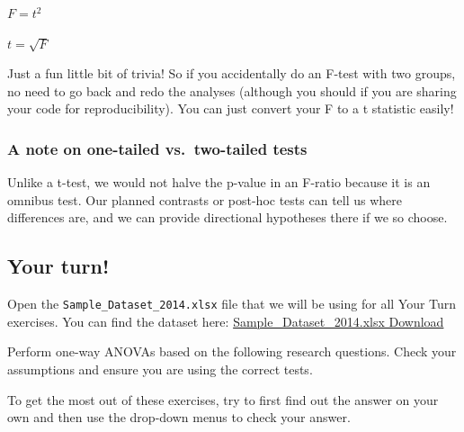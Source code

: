 \documentclass[
]{book}
\begin{document}
\(F = t^2\)

\(t = \sqrt{F}\)

Just a fun little bit of trivia! So if you accidentally do an F-test with two groups, no need to go back and redo the analyses (although you should if you are sharing your code for reproducibility). You can just convert your F to a t statistic easily!

\hypertarget{a-note-on-one-tailed-vs.-two-tailed-tests}{%
\subsubsection{A note on one-tailed vs.~two-tailed tests}\label{a-note-on-one-tailed-vs.-two-tailed-tests}}

Unlike a t-test, we would not halve the p-value in an F-ratio because it is an omnibus test. Our planned contrasts or post-hoc tests can tell us where differences are, and we can provide directional hypotheses there if we so choose.

\hypertarget{your-turn-5}{%
\subsection{Your turn!}\label{your-turn-5}}

Open the \texttt{Sample\_Dataset\_2014.xlsx} file that we will be using for all Your Turn exercises. You can find the dataset here: \href{https://github.com/danawanzer/stats-with-jamovi/blob/master/data/Sample_Dataset_2014.xlsx}{Sample\_Dataset\_2014.xlsx Download}

Perform one-way ANOVAs based on the following research questions. Check your assumptions and ensure you are using the correct tests.

To get the most out of these exercises, try to first find out the answer on your own and then use the drop-down menus to check your answer.
\end{document}
